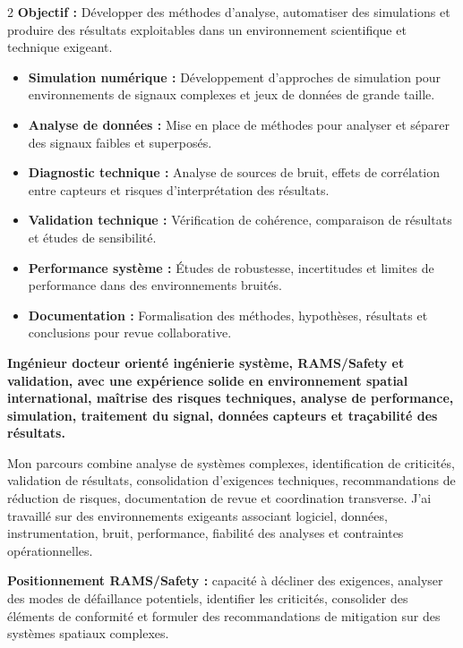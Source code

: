 \documentclass[8pt,a4paper,ragged2e,withhyper]{altacv}
\begin{document}
\begin{paracol}{2}
\textbf{Objectif :} Développer des méthodes d’analyse, automatiser des simulations et produire des résultats exploitables dans un environnement scientifique et technique exigeant.

\begin{itemize}
  \item \textbf{Simulation numérique :} Développement d’approches de simulation pour environnements de signaux complexes et jeux de données de grande taille.
  \item \textbf{Analyse de données :} Mise en place de méthodes pour analyser et séparer des signaux faibles et superposés.
  \item \textbf{Diagnostic technique :} Analyse de sources de bruit, effets de corrélation entre capteurs et risques d’interprétation des résultats.
  \item \textbf{Validation technique :} Vérification de cohérence, comparaison de résultats et études de sensibilité.
  \item \textbf{Performance système :} Études de robustesse, incertitudes et limites de performance dans des environnements bruités.
  \item \textbf{Documentation :} Formalisation des méthodes, hypothèses, résultats et conclusions pour revue collaborative.
\end{itemize}

\switchcolumn


\textbf{Ingénieur docteur orienté ingénierie système, RAMS/Safety et validation, avec une expérience solide en environnement spatial international, maîtrise des risques techniques, analyse de performance, simulation, traitement du signal, données capteurs et traçabilité des résultats.}

Mon parcours combine analyse de systèmes complexes, identification de criticités, validation de résultats, consolidation d’exigences techniques, recommandations de réduction de risques, documentation de revue et coordination transverse. J’ai travaillé sur des environnements exigeants associant logiciel, données, instrumentation, bruit, performance, fiabilité des analyses et contraintes opérationnelles.

\textbf{Positionnement RAMS/Safety :} capacité à décliner des exigences, analyser des modes de défaillance potentiels, identifier les criticités, consolider des éléments de conformité et formuler des recommandations de mitigation sur des systèmes spatiaux complexes.


\end{paracol}
\end{document}
